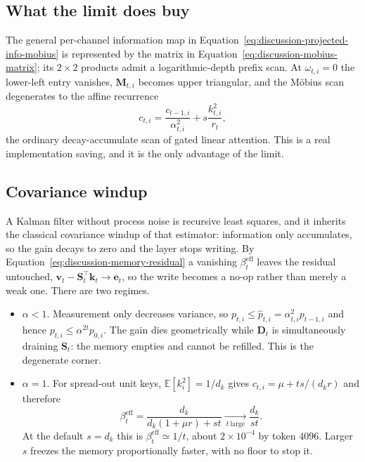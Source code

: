 \documentclass[11pt]{article}
\newcommand{\vct}[1]{\boldsymbol{#1}}
\begin{document}
\subsection{What the limit does buy}

The general per-channel information map in
Equation~\eqref{eq:discussion-projected-info-mobius} is represented by the matrix in
Equation~\eqref{eq:discussion-mobius-matrix}; its $2\times2$ products admit a logarithmic-depth
prefix scan. At $\omega_{t,i}=0$ the lower-left entry vanishes, $\vct{M}_{t,i}$ becomes upper
triangular, and the M\"obius scan degenerates to the affine recurrence
\begin{equation}
  c_{t,i}=\frac{c_{t-1,i}}{\alpha_{t,i}^2}+s\frac{k_{t,i}^2}{r_t},
  \label{eq:discussion-affine-info-recurrence}
\end{equation}
the ordinary decay-accumulate scan of gated linear attention. This is a real implementation
saving, and it is the only advantage of the limit.

\subsection{Covariance windup}

A Kalman filter without process noise is recursive least squares, and it inherits the classical
covariance windup of that estimator: information only accumulates, so the gain decays to zero and
the layer stops writing. By Equation~\eqref{eq:discussion-memory-residual} a vanishing
$\beta_t^{\mathrm{eff}}$ leaves the residual untouched,
$\vct{v}_t-\vct{S}_t^\top\vct{k}_t\to\vct{e}_t$, so the write becomes a no-op rather than merely
a weak one. There are two regimes.
\begin{itemize}
  \item $\alpha<1$. Measurement only decreases variance, so
    $p_{t,i}\leq\widehat p_{t,i}=\alpha_{t,i}^2p_{t-1,i}$ and hence
    $p_{t,i}\leq\alpha^{2t}p_{0,i}$. The gain dies geometrically while $\vct{D}_t$ is
    simultaneously draining $\vct{S}_t$: the memory empties and cannot be refilled. This is the
    degenerate corner.
  \item $\alpha=1$. For spread-out unit keys, $\mathbb{E}[k_i^2]=1/d_k$ gives
    $c_{t,i}=\mu+ts/(d_kr)$ and therefore
    \begin{equation}
      \beta_t^{\mathrm{eff}}
      =\frac{d_k}{d_k(1+\mu r)+st}
      \xrightarrow[\ t\ \text{large}\ ]{}\frac{d_k}{st}.
      \label{eq:discussion-rls-gain-decay}
    \end{equation}
    At the default $s=d_k$ this is $\beta_t^{\mathrm{eff}}\simeq1/t$, about $2\times10^{-4}$ by
    token $4096$. Larger $s$ freezes the memory proportionally faster, with no floor to stop it.
\end{itemize}
\end{document}
